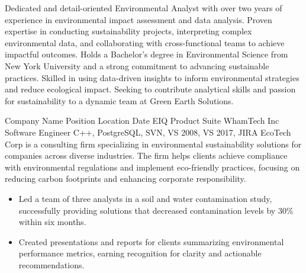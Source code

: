 \documentclass[10pt, a4paper]{cvhari}
\begin{document}
	
	\makecvheader
	\medskip
	
	
	
	Dedicated and detail-oriented Environmental Analyst with over two years of experience in environmental impact assessment and data analysis. Proven expertise in conducting sustainability projects, interpreting complex environmental data, and collaborating with cross-functional teams to achieve impactful outcomes. Holds a Bachelor’s degree in Environmental Science from New York University and a strong commitment to advancing sustainable practices. Skilled in using data-driven insights to inform environmental strategies and reduce ecological impact. Seeking to contribute analytical skills and passion for sustainability to a dynamic team at Green Earth Solutions.
	\medskip
	
	
	
	\company
	{Company Name}
	{Position}
	{Location}
	{Date}
	    \project
	        {EIQ Product Suite}
	        {WhamTech Inc}
	        {Software Engineer}
	        {C++, PostgreSQL, SVN, VS 2008, VS 2017, JIRA}
	\smallskip
	EcoTech Corp is a consulting firm specializing in environmental sustainability solutions for companies across diverse industries. The firm helps clients achieve compliance with environmental regulations and implement eco-friendly practices, focusing on reducing carbon footprints and enhancing corporate responsibility.
	\smallskip
	\begin{itemize}
		\item Led a team of three analysts in a soil and water contamination study, successfully providing solutions that decreased contamination levels by 30\% within six months.
		\item Created presentations and reports for clients summarizing environmental performance metrics, earning recognition for clarity and actionable recommendations.
	\end{itemize}
	
	\smallskip
	\divider
	\smallskip
	
\end{document}

